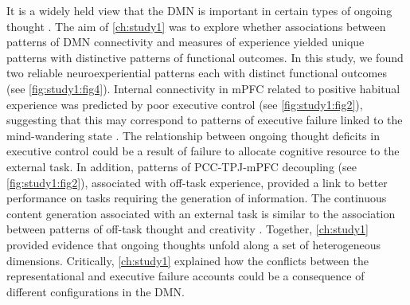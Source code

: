 It is a widely held view that the DMN is important in certain types of ongoing thought \cite<see a review from>{SmallwoodSchooler2015}. The aim of \cref{ch:study1} was to explore whether associations between patterns of DMN connectivity and measures of experience yielded unique patterns with distinctive patterns of functional outcomes. In this study, we found two reliable neuroexperiential patterns each with distinct functional outcomes (see \cref{fig:study1:fig4}). Internal connectivity in mPFC related to positive habitual experience was predicted by poor executive control (see \cref{fig:study1:fig2}), suggesting that this may correspond to patterns of executive failure linked to the mind-wandering state \cite{McVay2009}. The relationship between ongoing thought deficits in executive control could be a result of failure to allocate cognitive resource to the external task. In addition, patterns of PCC-TPJ-mPFC decoupling (see \cref{fig:study1:fig2}), associated with off-task experience, provided a link to better performance on tasks requiring the generation of information.  The continuous content generation associated with an external task is similar to the association between patterns of off-task thought and creativity \cite{Baird2012}. Together, \cref{ch:study1} provided evidence that ongoing thoughts unfold along a set of heterogeneous dimensions. Critically, \cref{ch:study1} explained how the conflicts between the representational and executive failure accounts could be a consequence of different configurations in the DMN.

